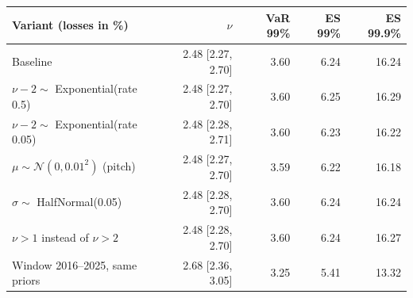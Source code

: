 \begin{tabular}{lrrrr}
\toprule
Variant (losses in \%) & $\nu$ & VaR 99\% & ES 99\% & ES 99.9\% \\
\midrule
Baseline & 2.48 [2.27, 2.70] & 3.60 & 6.24 & 16.24 \\
$\nu - 2 \sim$ Exponential(rate 0.5) & 2.48 [2.27, 2.70] & 3.60 & 6.25 & 16.29 \\
$\nu - 2 \sim$ Exponential(rate 0.05) & 2.48 [2.28, 2.71] & 3.60 & 6.23 & 16.22 \\
$\mu \sim \mathcal{N}(0, 0.01^2)$ (pitch) & 2.48 [2.27, 2.70] & 3.59 & 6.22 & 16.18 \\
$\sigma \sim$ HalfNormal(0.05) & 2.48 [2.28, 2.70] & 3.60 & 6.24 & 16.24 \\
$\nu > 1$ instead of $\nu > 2$ & 2.48 [2.28, 2.70] & 3.60 & 6.24 & 16.27 \\
Window 2016--2025, same priors & 2.68 [2.36, 3.05] & 3.25 & 5.41 & 13.32 \\
\bottomrule
\end{tabular}
